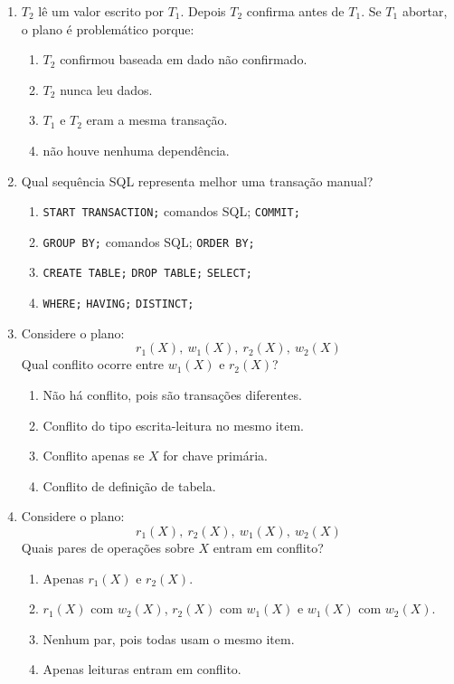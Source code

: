 \documentclass[12pt,a4paper]{article}
\begin{document}
\begin{enumerate}[resume,label=\textbf{Q\arabic*.}]
\item $T_2$ lê um valor escrito por $T_1$. Depois $T_2$ confirma antes de $T_1$. Se $T_1$ abortar, o plano é problemático porque:

\begin{enumerate}[label=\alph*)]
    \item $T_2$ confirmou baseada em dado não confirmado.
    \item $T_2$ nunca leu dados.
    \item $T_1$ e $T_2$ eram a mesma transação.
    \item não houve nenhuma dependência.
\end{enumerate}

\item Qual sequência SQL representa melhor uma transação manual?

\begin{enumerate}[label=\alph*)]
    \item \texttt{START TRANSACTION;} comandos SQL; \texttt{COMMIT;}
    \item \texttt{GROUP BY;} comandos SQL; \texttt{ORDER BY;}
    \item \texttt{CREATE TABLE;} \texttt{DROP TABLE;} \texttt{SELECT;}
    \item \texttt{WHERE;} \texttt{HAVING;} \texttt{DISTINCT;}
\end{enumerate}

\item Considere o plano:
\[
r_1(X),\ w_1(X),\ r_2(X),\ w_2(X)
\]
Qual conflito ocorre entre $w_1(X)$ e $r_2(X)$?

\begin{enumerate}[label=\alph*)]
    \item Não há conflito, pois são transações diferentes.
    \item Conflito do tipo escrita-leitura no mesmo item.
    \item Conflito apenas se $X$ for chave primária.
    \item Conflito de definição de tabela.
\end{enumerate}

\item Considere o plano:
\[
r_1(X),\ r_2(X),\ w_1(X),\ w_2(X)
\]
Quais pares de operações sobre $X$ entram em conflito?

\begin{enumerate}[label=\alph*)]
    \item Apenas $r_1(X)$ e $r_2(X)$.
    \item $r_1(X)$ com $w_2(X)$, $r_2(X)$ com $w_1(X)$ e $w_1(X)$ com $w_2(X)$.
    \item Nenhum par, pois todas usam o mesmo item.
    \item Apenas leituras entram em conflito.
\end{enumerate}


\end{enumerate}
\end{document}
